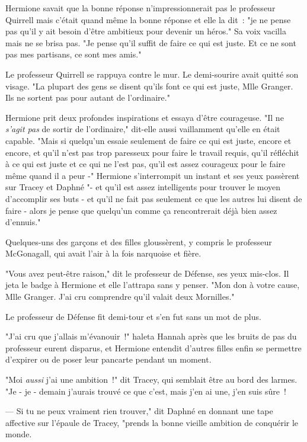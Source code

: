 Hermione savait que la bonne réponse n'impressionnerait pas le professeur Quirrell mais c'était quand même la bonne réponse et elle la dit~: "je ne pense pas qu'il y ait besoin d'être ambitieux pour devenir un héros." Sa voix vacilla mais ne se brisa pas. "Je pense qu'il suffit de faire ce qui est juste. Et ce ne sont pas mes partisans, ce sont mes amis."

Le professeur Quirrell se rappuya contre le mur. Le demi-sourire avait quitté son visage. "La plupart des gens se disent qu'ils font ce qui est juste, Mlle Granger. Ils ne sortent pas pour autant de l'ordinaire."

Hermione prit deux profondes inspirations et essaya d'être courageuse. "Il ne \emph{s'agit pas} de sortir de l'ordinaire," dit-elle aussi vaillamment qu'elle en était capable. "Mais si quelqu'un essaie seulement de faire ce qui est juste, encore et encore, et qu'il n'est pas trop paresseux pour faire le travail requis, qu'il réfléchit à ce qui est juste et ce qui ne l'est pas, qu'il est assez courageux pour le faire même quand il a peur -" Hermione s'interrompit un instant et ses yeux passèrent sur Tracey et Daphné "- et qu'il est assez intelligents pour trouver le moyen d'accomplir ses buts - et qu'il ne fait pas seulement ce que les autres lui disent de faire - alors je pense que quelqu'un comme ça rencontrerait déjà bien assez d'ennuis."

Quelques-uns des garçons et des filles gloussèrent, y compris le professeur McGonagall, qui avait l'air à la fois narquoise et fière.

"Vous avez peut-être raison," dit le professeur de Défense, ses yeux mis-clos. Il jeta le badge à Hermione et elle l'attrapa sans y penser. "Mon don à votre cause, Mlle Granger. J'ai cru comprendre qu'il valait deux Mornilles."

Le professeur de Défense fit demi-tour et s'en fut sans un mot de plus.

"J'ai cru que j'allais m'évanouir~!" haleta Hannah après que les bruits de pas du professeur eurent disparus, et Hermione entendit d'autres filles enfin se permettre d'expirer ou de poser leur pancarte pendant un moment.

"Moi \emph{aussi} j'ai une ambition~!" dit Tracey, qui semblait être au bord des larmes. "Je - je - demain j'aurais trouvé ce que c'est, mais j'en ai une, j'en suis sûre~! 

--- Si tu ne peux vraiment rien trouver," dit Daphné en donnant une tape affective sur l'épaule de Tracey, "prends la bonne vieille ambition de conquérir le monde.

